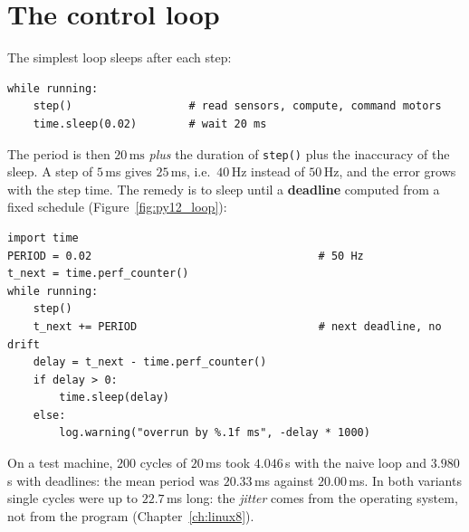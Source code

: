 \section*{The control loop}
The simplest loop sleeps after each step:
\begin{verbatim}
while running:
    step()                  # read sensors, compute, command motors
    time.sleep(0.02)        # wait 20 ms
\end{verbatim}
The period is then $20\,\text{ms}$ \emph{plus} the duration of \texttt{step()} plus the inaccuracy of the sleep. A step of $5$\,ms gives $25$\,ms, i.e.\ $40$\,Hz instead of $50$\,Hz, and the error grows with the step time. The remedy is to sleep until a \textbf{deadline} computed from a fixed schedule (Figure~\ref{fig:py12_loop}):
\begin{verbatim}
import time
PERIOD = 0.02                                   # 50 Hz
t_next = time.perf_counter()
while running:
    step()
    t_next += PERIOD                            # next deadline, no drift
    delay = t_next - time.perf_counter()
    if delay > 0:
        time.sleep(delay)
    else:
        log.warning("overrun by %.1f ms", -delay * 1000)
\end{verbatim}
\begin{center}
\label{fig:py12_loop}
\end{center}
On a test machine, $200$ cycles of $20$\,ms took $4.046$\,s with the naive loop and $3.980$\,s with deadlines: the mean period was $20.33$\,ms against $20.00$\,ms. In both variants single cycles were up to $22.7$\,ms long: the \emph{jitter} comes from the operating system, not from the program (Chapter~\ref{ch:linux8}).

